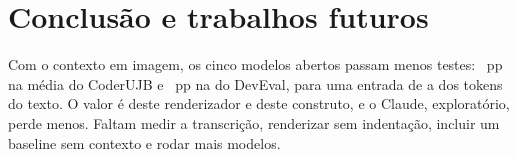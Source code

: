 \section{Conclusão e trabalhos futuros}
Com o contexto em imagem, os cinco modelos abertos passam menos testes: \gapMeanUjb~pp na média do CoderUJB e \gapMeanDev~pp na do DevEval, para uma entrada de \tokenRatioMinAll{} a \tokenRatioMaxAll{} dos tokens do texto. O valor é deste renderizador e deste construto, e o Claude, exploratório, perde menos. Faltam medir a transcrição, renderizar sem indentação, incluir um baseline sem contexto e rodar mais modelos.
\label{body-end}
